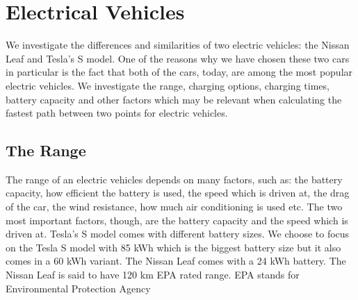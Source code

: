 
\section{Electrical Vehicles}

We investigate the differences and similarities of two electric vehicles: the Nissan Leaf and Tesla's S model. 
One of the reasons why we have chosen these two cars in particular is the fact that both of the cars, today, 
are among the most popular electric vehicles. We investigate the range, charging options, charging times, 
battery capacity and other factors which may be relevant when calculating the fastest path between two points for 
electric vehicles.

\subsection{The Range}

The range of an electric vehicles depends on many factors, such as: the battery capacity, how efficient the battery
is used, the speed which is driven at, the drag of the car, the wind resistance, how much air conditioning is 
used etc. The two most important factors, though, are the battery capacity and the speed which is driven at. 
Tesla's S model comes with different battery sizes. We choose to focus on the Tesla S model with 85 kWh which is 
the biggest battery size but it also comes in a 60 kWh variant. The Nissan Leaf comes with a 24 kWh battery. The 
Nissan Leaf is said to have 120 km EPA rated range. EPA stands for Environmental Protection Agency 